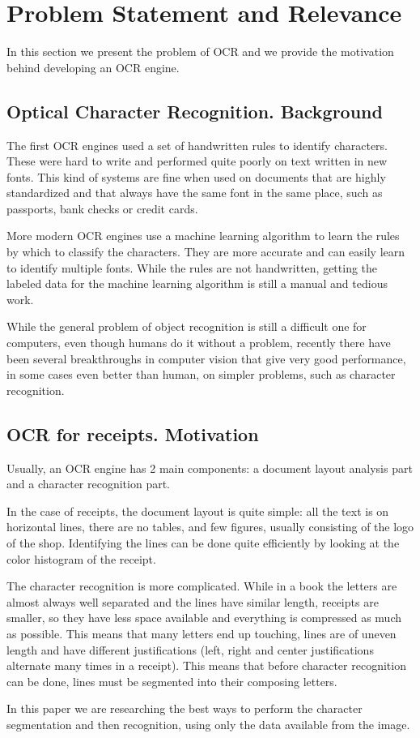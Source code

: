 \section{Problem Statement and Relevance}
\label{sec:statement}
In this section we present the problem of OCR and we provide the motivation behind developing an OCR engine. 

\subsection{Optical Character Recognition. Background}

The first OCR engines used a set of handwritten rules to identify characters\cite{shepard1971reading}. These were hard to write and performed quite poorly on text written in new fonts. This kind of systems are fine when used on documents that are highly standardized and that always have the same font in the same place, such as passports, bank checks or credit cards. 

More modern OCR engines use a machine learning algorithm to learn the rules by which to classify the characters\cite{smith2007overview}. They are more accurate and can easily learn to identify multiple fonts. While the rules are not handwritten, getting the labeled data for the machine learning algorithm is still a manual and tedious work. 

While the general problem of object recognition is still a difficult one for computers, even though humans do it without a problem, recently there have been several breakthroughs in computer vision that give very good performance, in some cases even better than human, on simpler problems, such as character recognition. 

\subsection{OCR for receipts. Motivation}
Usually, an OCR engine has 2 main components: a document layout analysis part and a character recognition part. 

In the case of receipts, the document layout is quite simple: all the text is on horizontal lines, there are no tables, and few figures, usually consisting of the logo of the shop. Identifying the lines can be done quite efficiently by looking at the color histogram of the receipt. 

The character recognition is more complicated. While in a book the letters are almost always well separated and the lines have similar length, receipts are smaller, so they have less space available and everything is compressed as much as possible. This means that many letters end up touching, lines are of uneven length and have different justifications (left, right and center justifications alternate many times in a receipt). This means that before character recognition can be done, lines must be segmented into their composing letters. 

In this paper we are researching the best ways to perform the character segmentation and then recognition, using only the data available from the image. 